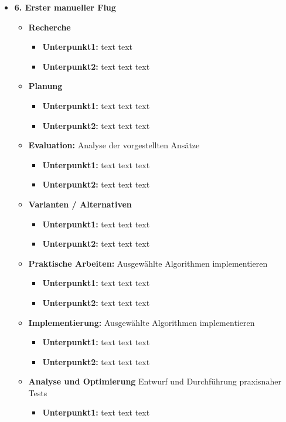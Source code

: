 \documentclass[lang=ngerman,inputenc=utf8,fontsize=10pt]{ldvarticle}
\begin{document}
\begin{itemize}
\item \textbf{6. Erster manueller Flug}
\begin{itemize}
<<<<<<< HEAD
	\item \textbf{Recherche}
		\begin{itemize}
			\item \textbf{Unterpunkt1:}  text text
			\item \textbf{Unterpunkt2:} text text text
		\end{itemize}
	\item \textbf{Planung}
		\begin{itemize}
			\item \textbf{Unterpunkt1:} text text text
			\item \textbf{Unterpunkt2:} text text text
		\end{itemize}
	\item \textbf{Evaluation:} Analyse der vorgestellten Ansätze
		\begin{itemize}
			\item \textbf{Unterpunkt1:} text text text
			\item \textbf{Unterpunkt2:} text text text
		\end{itemize}
	\item \textbf{Varianten / Alternativen}  
		\begin{itemize}
			\item \textbf{Unterpunkt1:} text text text
			\item \textbf{Unterpunkt2:} text text text
		\end{itemize}
	\item \textbf{Praktische Arbeiten:} Ausgewählte Algorithmen implementieren 
		\begin{itemize}
			\item \textbf{Unterpunkt1:} text text text
			\item \textbf{Unterpunkt2:} text text text 
		\end{itemize}
	\item \textbf{Implementierung:} Ausgewählte Algorithmen implementieren 
		\begin{itemize}
			\item \textbf{Unterpunkt1:} text text text
			\item \textbf{Unterpunkt2:} text text text 
		\end{itemize}
	\item \textbf{Analyse und Optimierung} Entwurf und Durchführung praxisnaher Tests
		\begin{itemize}
			\item \textbf{Unterpunkt1:} text text text

\end{itemize}
\end{itemize}
\end{itemize}
\end{document}
